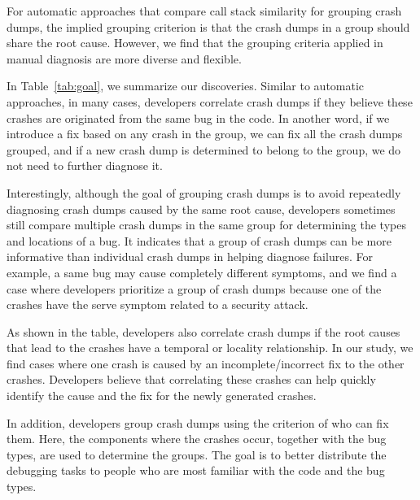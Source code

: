 
For automatic approaches that compare call stack similarity for grouping crash dumps, the implied grouping criterion is that the crash dumps in a group should share the root cause. However, we find that the grouping criteria applied in manual diagnosis are more diverse and flexible. 

In Table~\ref{tab:goal}, we summarize our discoveries. Similar to automatic approaches, in many cases, developers correlate crash dumps if they believe these crashes are originated from the same bug in the code. In another word, if we introduce a fix based on any crash in the group, we can fix all the crash dumps grouped, and if a new crash dump is determined to belong to the group, we do not need to further diagnose it.

Interestingly, although the goal of grouping crash dumps is to avoid repeatedly diagnosing crash dumps caused by the same root cause, developers sometimes still compare multiple crash dumps in the same group for determining the types and locations of a bug. It indicates that a group of crash dumps can be more informative than individual crash dumps in helping diagnose failures. For example, a same bug may cause completely different symptoms, and we find a case where developers prioritize a group of crash dumps because one of the crashes have the serve symptom related to a security attack. 

As shown in the table, developers also correlate crash dumps if the root causes that lead to the crashes have a temporal or locality relationship. In our study, we find cases where one crash is caused by an incomplete/incorrect fix to the other crashes. Developers believe that correlating these crashes can help quickly identify the cause and the fix for the newly generated crashes.

In addition, developers group crash dumps using the criterion of who can fix them. Here, the components where the crashes occur, together with the bug types, are used to determine the groups. The goal is to better distribute the debugging tasks to people who are most familiar with the code and the bug types.


